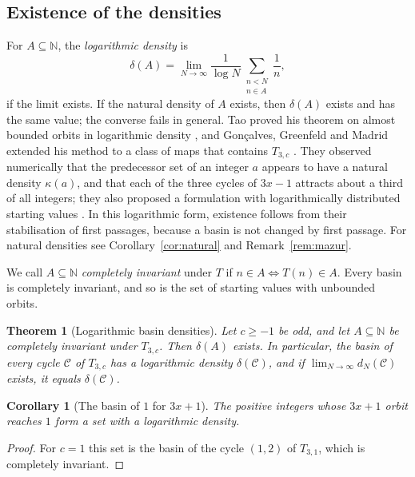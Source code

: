 \documentclass[12pt]{amsart}
\newtheorem{theorem}{Theorem}
\newtheorem{corollary}{Corollary}
\theoremstyle{definition}
\theoremstyle{remark}
\newcommand{\N}{\mathbb{N}}
\begin{document}
\subsection*{Existence of the densities}
For $A\subseteq\N$, the \emph{logarithmic density} is
\begin{equation}
\label{eq:logdens}
\delta(A)=\lim_{N\to\infty}\frac{1}{\log N}\sum_{\substack{n<N\\ n\in A}}\frac1n,
\end{equation}
if the limit exists. If the natural density of $A$ exists, then $\delta(A)$ exists and has the same value; the converse fails in general. Tao proved his theorem on almost bounded orbits in logarithmic density \cite{Tao_2022}, and Gon\c{c}alves, Greenfeld and Madrid extended his method to a class of maps that contains $T_{3,c}$ \cite{GGM_2025}. They observed numerically that the predecessor set of an integer $a$ appears to have a natural density $\kappa(a)$, and that each of the three cycles of $3x-1$ attracts about a third of all integers; they also proposed a formulation with logarithmically distributed starting values \cite[Remark~1.7]{GGM_2025}. In this logarithmic form, existence follows from their stabilisation of first passages, because a basin is not changed by first passage. For natural densities see Corollary~\ref{cor:natural} and Remark~\ref{rem:mazur}.

We call $A\subseteq\N$ \emph{completely invariant} under $T$ if $n\in A\iff T(n)\in A$. Every basin is completely invariant, and so is the set of starting values with unbounded orbits.

\begin{theorem}[Logarithmic basin densities]
\label{thm:logdens}
Let $c\ge-1$ be odd, and let $A\subseteq\N$ be completely invariant under $T_{3,c}$. Then $\delta(A)$ exists. In particular, the basin of every cycle $\mathcal C$ of $T_{3,c}$ has a logarithmic density $\delta(\mathcal C)$, and if $\lim_{N\to\infty}d_N(\mathcal C)$ exists, it equals $\delta(\mathcal C)$.
\end{theorem}

\begin{corollary}[The basin of $1$ for $3x+1$]
\label{cor:collatz}
The positive integers whose $3x+1$ orbit reaches $1$ form a set with a logarithmic density.
\end{corollary}

\begin{proof}
For $c=1$ this set is the basin of the cycle $(1,2)$ of $T_{3,1}$, which is completely invariant.
\end{proof}
\end{document}
